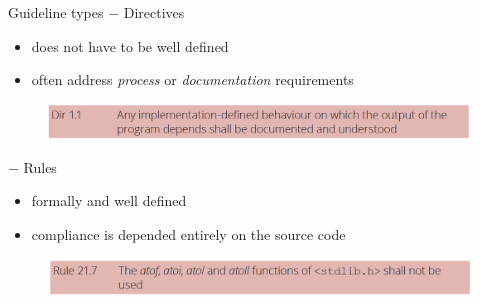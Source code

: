 \documentclass[t]{beamer} %
\begin{document}



\begin{frame}{Guideline types}
	        $-$ Directives
	            \begin{itemize}
	                \item does not have to be well defined
	                \item often address \textit{process} or \textit{documentation} requirements
	            \end{itemize}{}
	            \begin{figure}[h]
                \includegraphics[width=\textwidth]{dirdoc.PNG}
                \end{figure}
	         $-$ Rules
	            \begin{itemize}
	                \item formally and well defined
	                \item compliance is depended entirely on the source code %
	            \end{itemize}
	             \begin{figure}[h]
                \includegraphics[width=\textwidth]{rule1.PNG}
                \end{figure}
\end{frame}
\end{document}
